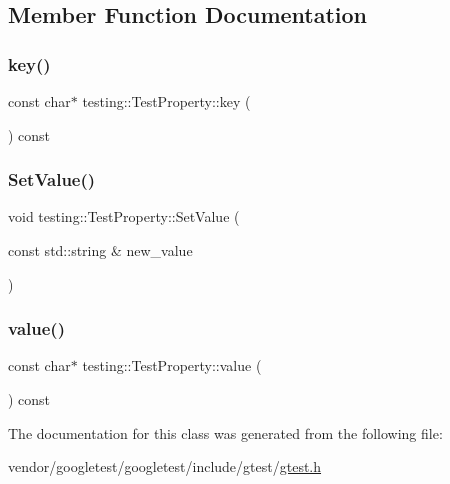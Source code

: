 \subsection{Member Function Documentation}
\mbox{\label{classtesting_1_1_test_property_ad60435d4ad04ac030487d8998fc61c5f}} 
\subsubsection{\texorpdfstring{key()}{key()}}
{\footnotesize\ttfamily const char$\ast$ testing\+::\+Test\+Property\+::key (\begin{DoxyParamCaption}{ }\end{DoxyParamCaption}) const\hspace{0.3cm}{\ttfamily [inline]}}

\mbox{\label{classtesting_1_1_test_property_a377245335d9f614cd06d1650e3358e1d}} 
\subsubsection{\texorpdfstring{Set\+Value()}{SetValue()}}
{\footnotesize\ttfamily void testing\+::\+Test\+Property\+::\+Set\+Value (\begin{DoxyParamCaption}\item[{const std\+::string \&}]{new\+\_\+value }\end{DoxyParamCaption})\hspace{0.3cm}{\ttfamily [inline]}}

\mbox{\label{classtesting_1_1_test_property_ad423a07af33c88b0c9ed33ee74815a63}} 
\subsubsection{\texorpdfstring{value()}{value()}}
{\footnotesize\ttfamily const char$\ast$ testing\+::\+Test\+Property\+::value (\begin{DoxyParamCaption}{ }\end{DoxyParamCaption}) const\hspace{0.3cm}{\ttfamily [inline]}}



The documentation for this class was generated from the following file\+:\begin{DoxyCompactItemize}
\item 
vendor/googletest/googletest/include/gtest/\hyperlink{gtest_8h}{gtest.\+h}\end{DoxyCompactItemize}
